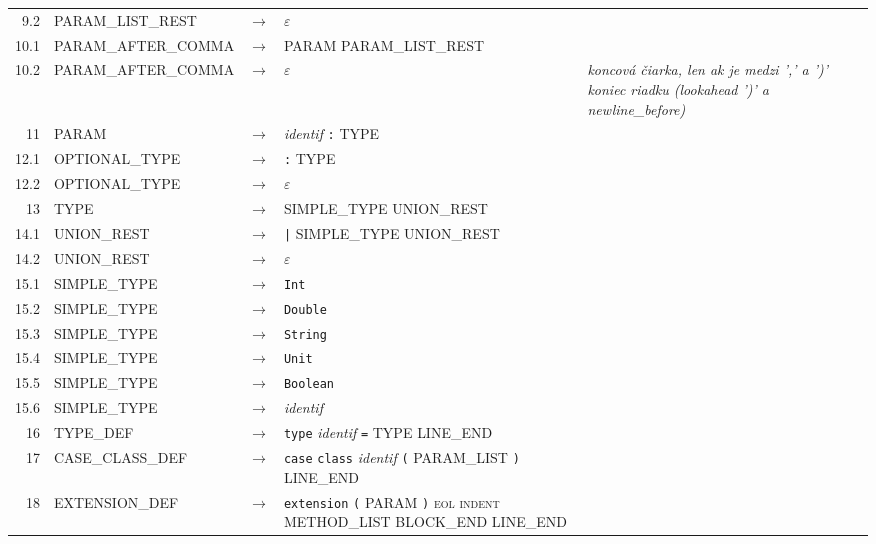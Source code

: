 \documentclass[11pt,a4paper]{article}
\begin{document}
{\begin{longtable}{r l c >{\raggedright\arraybackslash}p{6.6cm} >{\raggedright\arraybackslash}p{3.2cm}}
9.2 & \textsf{PARAM\_LIST\_REST} & $\rightarrow$ & $\varepsilon$ & {\scriptsize } \\
10.1 & \textsf{PARAM\_AFTER\_COMMA} & $\rightarrow$ & \textsf{PARAM} \textsf{PARAM\_LIST\_REST} & {\scriptsize } \\
10.2 & \textsf{PARAM\_AFTER\_COMMA} & $\rightarrow$ & $\varepsilon$ & {\scriptsize \textit{koncová čiarka, len ak je medzi ',' a ')' koniec riadku (lookahead ')' a newline\_before)}} \\
11 & \textsf{PARAM} & $\rightarrow$ & \textit{identif} \texttt{:} \textsf{TYPE} & {\scriptsize } \\
12.1 & \textsf{OPTIONAL\_TYPE} & $\rightarrow$ & \texttt{:} \textsf{TYPE} & {\scriptsize } \\
12.2 & \textsf{OPTIONAL\_TYPE} & $\rightarrow$ & $\varepsilon$ & {\scriptsize } \\
13 & \textsf{TYPE} & $\rightarrow$ & \textsf{SIMPLE\_TYPE} \textsf{UNION\_REST} & {\scriptsize } \\
14.1 & \textsf{UNION\_REST} & $\rightarrow$ & \texttt{|} \textsf{SIMPLE\_TYPE} \textsf{UNION\_REST} & {\scriptsize } \\
14.2 & \textsf{UNION\_REST} & $\rightarrow$ & $\varepsilon$ & {\scriptsize } \\
15.1 & \textsf{SIMPLE\_TYPE} & $\rightarrow$ & \texttt{Int} & {\scriptsize } \\
15.2 & \textsf{SIMPLE\_TYPE} & $\rightarrow$ & \texttt{Double} & {\scriptsize } \\
15.3 & \textsf{SIMPLE\_TYPE} & $\rightarrow$ & \texttt{String} & {\scriptsize } \\
15.4 & \textsf{SIMPLE\_TYPE} & $\rightarrow$ & \texttt{Unit} & {\scriptsize } \\
15.5 & \textsf{SIMPLE\_TYPE} & $\rightarrow$ & \texttt{Boolean} & {\scriptsize } \\
15.6 & \textsf{SIMPLE\_TYPE} & $\rightarrow$ & \textit{identif} & {\scriptsize } \\
16 & \textsf{TYPE\_DEF} & $\rightarrow$ & \texttt{type} \textit{identif} \texttt{=} \textsf{TYPE} \textsf{LINE\_END} & {\scriptsize } \\
17 & \textsf{CASE\_CLASS\_DEF} & $\rightarrow$ & \texttt{case} \texttt{class} \textit{identif} \texttt{(} \textsf{PARAM\_LIST} \texttt{)} \textsf{LINE\_END} & {\scriptsize } \\
18 & \textsf{EXTENSION\_DEF} & $\rightarrow$ & \texttt{extension} \texttt{(} \textsf{PARAM} \texttt{)} \textsc{eol} \textsc{indent} \textsf{METHOD\_LIST} \textsf{BLOCK\_END} \textsf{LINE\_END} & {\scriptsize } \\

\end{longtable}}
\end{document}
